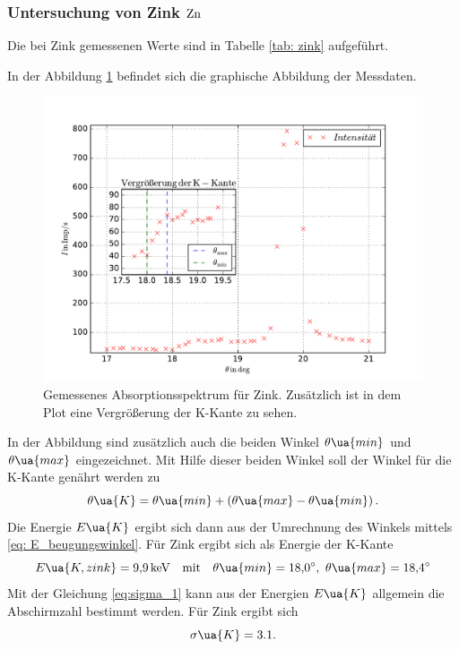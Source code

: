 \subsubsection{Untersuchung von Zink $\ce{Zn}$}\label{sec: zink}
Die bei Zink gemessenen Werte sind in Tabelle \ref{tab: zink} aufgeführt.

In der Abbildung \ref{fig: absotp_zink} befindet sich die graphische Abbildung der Messdaten.
\begin{figure}
  \centering
  \includegraphics[width=1\textwidth]{../Messdaten/zink.pdf}
  \caption{Gemessenes Absorptionsspektrum für Zink. Zusätzlich ist in dem Plot eine Vergrößerung der K-Kante zu sehen.} %
  \label{fig: absotp_zink}
\end{figure}
In der Abbildung sind zusätzlich auch die beiden Winkel $\theta\ua{min}$ und $\theta\ua{max}$
eingezeichnet. Mit Hilfe dieser beiden Winkel soll der Winkel für die K-Kante genährt werden zu
\begin{equation}
  \label{eq:theta_k}
  \theta\ua{K}=\theta\ua{min}+\left(\theta\ua{max}-\theta\ua{min}\right).
\end{equation}
Die Energie $E\ua{K}$ ergibt sich dann aus der Umrechnung des Winkels mittels \eqref{eq: E_beugungswinkel}.
Für Zink ergibt sich als Energie der K-Kante
\begin{equation*}
  E\ua{K,zink}=\SI{9.9}{\kilo\eV} \quad \text{mit}\quad \theta\ua{min}=\SI{18.0}{\degree},\, \,   \theta\ua{max}=\SI{18.4}{\degree}
\end{equation*}
Mit der Gleichung \eqref{eq:sigma_1} kann aus der Energien $E\ua{K}$ allgemein die Abschirmzahl
bestimmt werden.
Für Zink ergibt sich
\begin{equation}
  \label{eq: abschirm_zink}
  \sigma\ua{K}=3.1.
\end{equation}
\FloatBarrier
\FloatBarrier

